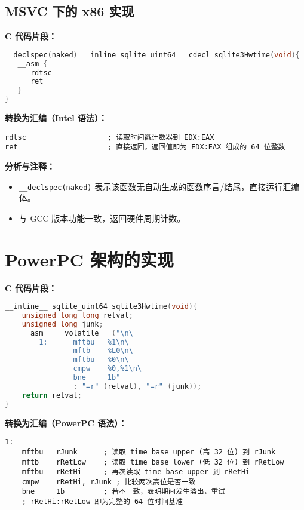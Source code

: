 \documentclass[12pt]{article}
\begin{document}
\subsection{MSVC 下的 x86 实现}

\textbf{C 代码片段：}
\begin{lstlisting}[language=C]
__declspec(naked) __inline sqlite_uint64 __cdecl sqlite3Hwtime(void){
   __asm {
      rdtsc
      ret
   }
}
\end{lstlisting}

\textbf{转换为汇编（Intel 语法）：}
\begin{lstlisting}[language={[x86masm]Assembler}]
rdtsc                   ; 读取时间戳计数器到 EDX:EAX
ret                     ; 直接返回，返回值即为 EDX:EAX 组成的 64 位整数
\end{lstlisting}

\textbf{分析与注释：}
\begin{itemize}
  \item \texttt{\_\_declspec(naked)} 表示该函数无自动生成的函数序言/结尾，直接运行汇编体。
  \item 与 GCC 版本功能一致，返回硬件周期计数。
\end{itemize}

\section{PowerPC 架构的实现}

\textbf{C 代码片段：}
\begin{lstlisting}[language=C]
__inline__ sqlite_uint64 sqlite3Hwtime(void){
    unsigned long long retval;
    unsigned long junk;
    __asm__ __volatile__ ("\n\
        1:      mftbu   %1\n\
                mftb    %L0\n\
                mftbu   %0\n\
                cmpw    %0,%1\n\
                bne     1b"
                : "=r" (retval), "=r" (junk));
    return retval;
}
\end{lstlisting}

\textbf{转换为汇编（PowerPC 语法）：}
\begin{lstlisting}[language={[x86masm]Assembler}]
1:
    mftbu   rJunk      ; 读取 time base upper (高 32 位) 到 rJunk
    mftb    rRetLow    ; 读取 time base lower (低 32 位) 到 rRetLow
    mftbu   rRetHi     ; 再次读取 time base upper 到 rRetHi
    cmpw    rRetHi, rJunk ; 比较两次高位是否一致
    bne     1b         ; 若不一致，表明期间发生溢出，重试
    ; rRetHi:rRetLow 即为完整的 64 位时间基准
\end{lstlisting}
\end{document}
